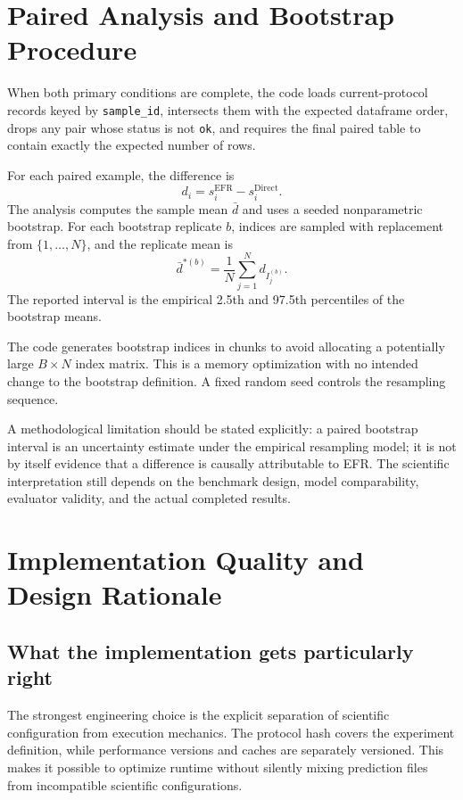 \documentclass[11pt,a4paper]{article}
\newcommand{\code}[1]{\texttt{#1}}
\begin{document}
\section{Paired Analysis and Bootstrap Procedure}
When both primary conditions are complete, the code loads current-protocol records keyed by \code{sample\_id}, intersects them with the expected dataframe order, drops any pair whose status is not \code{ok}, and requires the final paired table to contain exactly the expected number of rows.

For each paired example, the difference is
\begin{equation}
d_i = s_i^{\mathrm{EFR}} - s_i^{\mathrm{Direct}}.
\end{equation}
The analysis computes the sample mean \(\bar d\) and uses a seeded nonparametric bootstrap. For each bootstrap replicate \(b\), indices are sampled with replacement from \(\{1,\ldots,N\}\), and the replicate mean is
\begin{equation}
\bar d^{*(b)} = \frac{1}{N}\sum_{j=1}^{N} d_{I_j^{(b)}}.
\end{equation}
The reported interval is the empirical 2.5th and 97.5th percentiles of the bootstrap means.

The code generates bootstrap indices in chunks to avoid allocating a potentially large \(B \times N\) index matrix. This is a memory optimization with no intended change to the bootstrap definition. A fixed random seed controls the resampling sequence.

A methodological limitation should be stated explicitly: a paired bootstrap interval is an uncertainty estimate under the empirical resampling model; it is not by itself evidence that a difference is causally attributable to EFR. The scientific interpretation still depends on the benchmark design, model comparability, evaluator validity, and the actual completed results.

\section{Implementation Quality and Design Rationale}
\subsection{What the implementation gets particularly right}
The strongest engineering choice is the explicit separation of scientific configuration from execution mechanics. The protocol hash covers the experiment definition, while performance versions and caches are separately versioned. This makes it possible to optimize runtime without silently mixing prediction files from incompatible scientific configurations.
\end{document}
